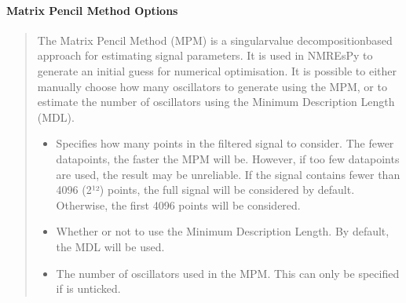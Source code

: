 \documentclass[letterpaper,10pt,english]{sphinxmanual}
\begin{document}
\paragraph{Matrix Pencil Method Options}
\label{\detokenize{gui/usage/setup:matrix-pencil-method-options}}\begin{quote}

\sphinxAtStartPar
The Matrix Pencil Method (MPM) is a singular\sphinxhyphen{}value decomposition\sphinxhyphen{}based approach
for estimating signal parameters. It is used in NMR\sphinxhyphen{}EsPy to generate an
initial guess for numerical optimisation. It is possible to either manually
choose how many oscillators to generate using the MPM, or to
estimate the number of oscillators using the Minimum Description Length (MDL).
\begin{itemize}
\item {} 
\sphinxAtStartPar
{} \sphinxhyphen{} Specifies how many points in the filtered
signal to consider. The fewer datapoints, the faster the MPM
will be. However, if too few datapoints are used, the result may be
unreliable. If the signal contains fewer than 4096 (2¹²) points, the
full signal will be considered by default. Otherwise, the first 4096 points
will be considered.

\item {} 
\sphinxAtStartPar
{} \sphinxhyphen{} Whether or not to use the Minimum Description Length.
By default, the MDL will be used.

\item {} 
\sphinxAtStartPar
{} \sphinxhyphen{} The number of oscillators used in the MPM.
This can only be specified if  is unticked.

\end{itemize}
\end{quote}
\end{document}

